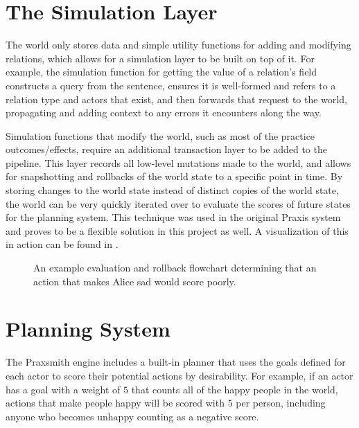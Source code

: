 \section{The Simulation Layer} \label{sec:Transactions}

The world only stores data and simple utility functions for adding and modifying
relations, which allows for a simulation layer to be built on top of it. For example,
the simulation function for getting the value of a relation's field constructs a
query from the sentence, ensures it is well-formed and refers to a relation type
and actors that exist, and then forwards that request to the world, propagating
and adding context to any errors it encounters along the way.

Simulation functions that modify the world, such as most of the practice outcomes\slash effects,
require an additional transaction layer to be added to the pipeline. This layer records
all low-level mutations made to the world, and allows for snapshotting and rollbacks of
the world state to a specific point in time. By storing changes to the world state instead
of distinct copies of the world state, the world can be very quickly iterated over
to evaluate the scores of future states for the planning system. This technique was used in
the original Praxis system and proves to be a flexible solution in this project as well. \cite{evans_ai_2015}
A visualization of this in action can be found in .

\begin{figure}
    \centering
    \begin{tikzpicture}[scale=1.25]
        
    \end{tikzpicture}
    \caption{An example evaluation and rollback flowchart determining that an action that makes Alice sad would score poorly.}
    \label{fig:WorldStateRollback}
\end{figure}

\section{Planning System} \label{sec:PlanningSystem}

The Praxsmith engine includes a built-in planner that uses the goals defined for each
actor to score their potential actions by desirability. For example, if an actor has a
goal with a weight of $5$ that counts all of the happy people in the world, actions that
make people happy will be scored with $5$ per person, including anyone who becomes unhappy
counting as a negative score.

